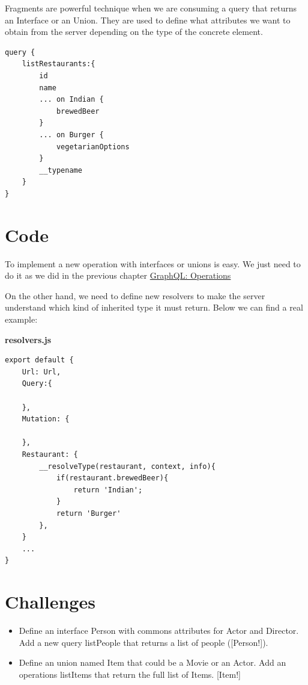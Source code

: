 \documentclass[]{book}
\providecommand{\tightlist}{%
  \setlength{\itemsep}{0pt}\setlength{\parskip}{0pt}}
\begin{document}
Fragments are powerful technique when we are consuming a query that
returns an Interface or an Union. They are used to define what
attributes we want to obtain from the server depending on the type of
the concrete element.

\begin{verbatim}
query {
    listRestaurants:{
        id
        name
        ... on Indian {
            brewedBeer
        }
        ... on Burger {
            vegetarianOptions
        }
        __typename
    }
}  
\end{verbatim}

\section{Code}\label{code-2}

To implement a new operation with interfaces or unions is easy. We just
need to do it as we did in the previous chapter
\protect\hyperlink{GraphQL:-Operations}{GraphQL: Operations}

On the other hand, we need to define new resolvers to make the server
understand which kind of inherited type it must return. Below we can
find a real example:

\textbf{resolvers.js}

\begin{verbatim}
export default {
    Url: Url,
    Query:{
    
    },
    Mutation: {
    
    },
    Restaurant: {
        __resolveType(restaurant, context, info){
            if(restaurant.brewedBeer){
                return 'Indian';
            }
            return 'Burger'
        },
    }
    ...
}
\end{verbatim}

\section{Challenges}\label{challenges-3}

\begin{itemize}
\tightlist
\item
  Define an interface Person with commons attributes for Actor and
  Director. Add a new query listPeople that returns a list of people
  ({[}Person!{]}).
\item
  Define an union named Item that could be a Movie or an Actor. Add an
  operations listItems that return the full list of Items. {[}Item!{]}
\end{itemize}
\end{document}
